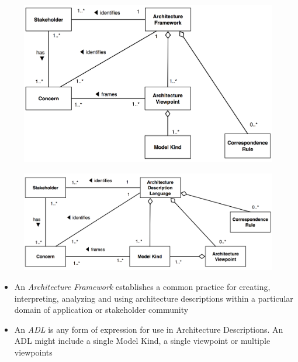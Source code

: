		\begin{frame}
					\begin{figure}
						\begin{center}
							\includegraphics[width=\textwidth]{img/ConceptualModelFramework}
						\end{center}
					\end{figure}
		\end{frame}
		
		\begin{frame}
			\begin{figure}
						\begin{center}
							\includegraphics[width=\textwidth]{img/ConceptualModelADL}
						\end{center}
					\end{figure}
		\end{frame}
		
		\begin{frame}
			\begin{itemize}
				\item An \emph{Architecture Framework} establishes a common practice for creating, interpreting, analyzing and using architecture descriptions within a particular domain of application or stakeholder community
				\vspace{0.3cm}
				\item An \emph{ADL} is any form of expression for use in Architecture Descriptions. An ADL might include a single Model Kind, a single viewpoint or multiple viewpoints
			\end{itemize}
		\end{frame}
		
